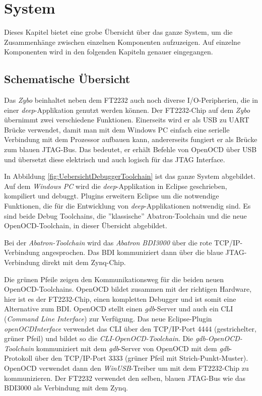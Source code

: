 \chapter{System}
Dieses Kapitel bietet eine grobe Übersicht über das ganze System, um die Zusammenhänge zwischen einzelnen Komponenten aufzuzeigen.
Auf einzelne Komponenten wird in den folgenden Kapiteln genauer eingegangen.


\section{Schematische Übersicht}
Das \textit{Zybo} beinhaltet neben dem FT2232 auch noch diverse I/O-Peripherien, die in einer \textit{deep}-Applikation genutzt werden können.
Der FT2232-Chip auf dem \textit{Zybo} übernimmt zwei verschiedene Funktionen.
Einerseits wird er als USB zu UART Brücke verwendet, damit man mit dem Windows PC einfach eine serielle Verbindung mit dem Prozessor aufbauen kann, andererseits fungiert er als Brücke zum blauen JTAG-Bus.
Das bedeutet, er erhält Befehle von OpenOCD über USB und übersetzt diese elektrisch und auch logisch für das JTAG Interface.

In Abbildung \ref{fig:UebersichtDebuggerToolchain} ist das ganze System abgebildet.
Auf dem \textit{Windows PC} wird die \textit{deep}-Applikation in Eclipse geschrieben, kompiliert und debuggt.
Plugins erweitern Eclipse um die notwendige Funktionen, die für die Entwicklung von \textit{deep}-Applikationen notwendig sind.
Es sind beide Debug Toolchains, die ''klassische'' Abatron-Toolchain und die neue OpenOCD-Toolchain, in dieser Übersicht abgebildet.

Bei der \textit{Abatron-Toolchain} wird das \textit{Abatron BDI3000} über die rote TCP/IP-Verbindung angesprochen.
Das BDI kommuniziert dann über die blaue JTAG-Verbindung direkt mit dem Zynq-Chip.

Die grünen Pfeile zeigen den Kommunikationsweg für die beiden neuen OpenOCD-Toolchains.
OpenOCD bildet zusammen mit der richtigen Hardware, hier ist es der FT2232-Chip, einen kompletten Debugger und ist somit eine Alternative zum BDI.
OpenOCD stellt einen \textit{gdb}-Server und auch ein CLI (\textit{Command Line Interface}) zur Verfügung.
Das neue Eclipse-Plugin \textit{openOCDInterface} verwendet das CLI über den TCP/IP-Port 4444 (gestrichelter, grüner Pfeil) und bildet so die \textit{CLI-OpenOCD-Toolchain}.
Die \textit{gdb-OpenOCD-Toolchain} kommuniziert mit dem \textit{gdb}-Server von OpenOCD mit dem \textit{gdb}-Protokoll über den TCP/IP-Port 3333 (grüner Pfeil mit Strich-Punkt-Muster).
OpenOCD verwendet dann den \textit{WinUSB}-Treiber um mit dem FT2232-Chip zu kommunizieren.
Der FT2232 verwendet den selben, blauen JTAG-Bus wie das BDI3000 als Verbindung mit dem Zynq.

